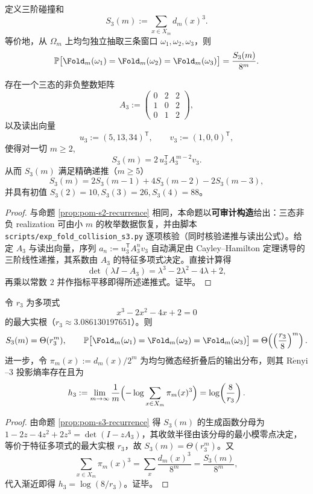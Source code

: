 \begin{definition}[三阶折叠碰撞矩]\label{def:pom-s3}
定义三阶碰撞和
$$
S_3(m):=\sum_{x\in X_m} d_m(x)^3.
$$
等价地，从 \(\Omega_m\) 上均匀独立抽取三条窗口 \(\omega_1,\omega_2,\omega_3\)，则
$$
\mathbb{P}\bigl[\Fold_m(\omega_1)=\Fold_m(\omega_2)=\Fold_m(\omega_3)\bigr]=\frac{S_3(m)}{8^m}.
$$
\end{definition}

\begin{proposition}[三阶碰撞核的三态表示与三阶递推]\label{prop:pom-s3-recurrence}
存在一个三态的非负整数矩阵
$$
A_3:=
\begin{pmatrix}
0&2&2\\
1&0&2\\
0&1&2
\end{pmatrix},
$$
以及读出向量
$$
u_3:=(5,13,34)^{\mathsf T},\qquad v_3:=(1,0,0)^{\mathsf T},
$$
使得对一切 \(m\ge 2\),
$$
S_3(m)=2\,u_3^{\mathsf T}A_3^{\,m-2}v_3.
$$
从而 \(S_3(m)\) 满足精确递推（\(m\ge 5\)）
$$
S_3(m)=2S_3(m-1)+4S_3(m-2)-2S_3(m-3),
$$
并具有初值 \(S_3(2)=10,S_3(3)=26,S_3(4)=88\)。
\end{proposition}
\begin{proof}
与命题 \ref{prop:pom-s2-recurrence} 相同，本命题以\textbf{可审计构造}给出：三态非负 realization 可由小 \(m\) 的枚举数据恢复，并由脚本 \texttt{scripts/exp\_fold\_collision\_s3.py} 逐项核验（同时核验递推与读出公式）。给定 \(A_3\) 与读出向量，序列
\(
a_n:=u_3^{\mathsf T}A_3^{n}v_3
\)
自动满足由 Cayley--Hamilton 定理诱导的三阶线性递推，其系数由 \(A_3\) 的特征多项式决定。直接计算得
$$
\det(\lambda I-A_3)=\lambda^3-2\lambda^2-4\lambda+2,
$$
再乘以常数 \(2\) 并作指标平移即得所述递推式。证毕。
\end{proof}

\begin{corollary}\label{cor:pom-s3-asymptotic}
令 \(r_3\) 为多项式
$$
x^3-2x^2-4x+2=0
$$
的最大实根（\(r_3\approx 3.086130197651\)）。则
$$
S_3(m)=\Theta(r_3^m),
\qquad
\mathbb{P}\bigl[\Fold_m(\omega_1)=\Fold_m(\omega_2)=\Fold_m(\omega_3)\bigr]
=\Theta\!\left(\left(\frac{r_3}{8}\right)^m\right).
$$
进一步，令 \(\pi_m(x):=d_m(x)/2^m\) 为均匀微态经折叠后的输出分布，则其 \(\mathrm{R\acute{e}nyi}\)--3 投影熵率存在且为
$$
h_3:=\lim_{m\to\infty}\frac{1}{m}\Bigl(-\log\sum_{x\in X_m}\pi_m(x)^3\Bigr)
=\log\!\left(\frac{8}{r_3}\right).
$$
\end{corollary}
\begin{proof}
由命题 \ref{prop:pom-s3-recurrence} 得 \(S_3(m)\) 的生成函数分母为 \(1-2z-4z^2+2z^3=\det(I-zA_3)\)，其收敛半径由该分母的最小模零点决定，等价于特征多项式的最大实根 \(r_3\)，故 \(S_3(m)=\Theta(r_3^m)\)。又
$$
\sum_{x\in X_m}\pi_m(x)^3=\sum_x \frac{d_m(x)^3}{8^m}=\frac{S_3(m)}{8^m},
$$
代入渐近即得 \(h_3=\log(8/r_3)\)。证毕。
\end{proof}

